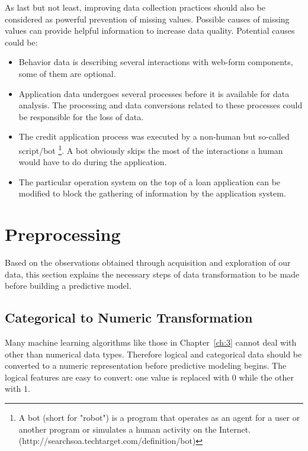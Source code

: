 As last but not least, improving data collection practices should also be considered as powerful prevention of missing values. Possible causes of missing values can provide helpful information to increase data quality. 
Potential causes could be:
    \begin{itemize}
    
        \item Behavior data is describing several interactions with web-form components, some of them are optional.
        
        \item Application data undergoes several processes before it is available for data analysis. The processing and data conversions related to these processes could be responsible for the loss of data.
        
        \item The credit application process was executed by a non-human but so-called script/bot \footnote{A bot (short for "robot") is a program that operates as an agent for a user or another program or simulates a human activity on the Internet. (http://searchsoa.techtarget.com/definition/bot)}. A bot obviously skips the most of the interactions a human would have to do during the application. 
    
        \item The particular operation system on the top of a loan application can be modified to block the gathering of information by the application system.
    \end{itemize}

\section{Preprocessing}\label{Ch:2:Preprocessing}
Based on the observations obtained through acquisition and exploration of our data, this section explains the necessary steps of data transformation to be made before building a predictive model.

\subsection{Categorical to Numeric Transformation}
\label{Ch:2:CTNT}
Many machine learning algorithms like those in Chapter~\ref{ch:3} cannot deal with other than numerical data types. Therefore logical and categorical data should be converted to a numeric representation before predictive modeling begins. 
The logical features are easy to convert: one value is replaced with \(0\) while the other with \(1\).

